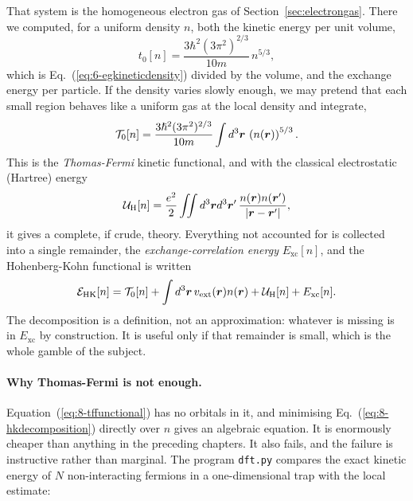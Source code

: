 That system is the homogeneous electron gas of
Section~\ref{sec:electrongas}.  There we computed, for a uniform density
$n$, both the kinetic energy per unit volume,
\begin{equation}
  t_0[n] = \frac{3\hbar^2(3\pi^2)^{2/3}}{10m}\,n^{5/3},
  \label{eq:8-tf}
\end{equation}
which is Eq.~(\ref{eq:6-egkineticdensity}) divided by the volume, and the
exchange energy per particle.  If the density varies slowly enough, we may
pretend that each small region behaves like a uniform gas at the local
density and integrate,
\begin{equation}
  \mathcal{T}_0[n] = \frac{3\hslash^2(3\pi^2)^{2/3}}{10m}
    \int d^3\bm{r}\,\left(n(\bm{r})\right)^{5/3}.
  \label{eq:8-tffunctional}
\end{equation}
This is the \emph{Thomas-Fermi} kinetic functional, and with the classical
electrostatic (Hartree) energy
\begin{equation}
  \mathcal{U}_{\mathrm{H}}[n] = \frac{e^2}{2}
    \iint d^3\bm{r}d^3\bm{r}'\,
    \frac{n(\bm{r})n(\bm{r}')}{\vert\bm{r}-\bm{r}'\vert},
  \label{eq:8-hartree}
\end{equation}
it gives a complete, if crude, theory.  Everything not accounted for is
collected into a single remainder, the \emph{exchange-correlation energy}
$E_{\mathrm{xc}}[n]$, and the Hohenberg-Kohn functional is written
\begin{equation}
  \mathcal{E}_{\mathrm{HK}}[n]
   = \mathcal{T}_0[n]
   + \int d^3\bm{r}\,v_{\mathrm{ext}}(\bm{r})n(\bm{r})
   + \mathcal{U}_{\mathrm{H}}[n]
   + E_{\mathrm{xc}}[n].
  \label{eq:8-hkdecomposition}
\end{equation}
The decomposition is a definition, not an approximation: whatever is missing
is in $E_{\mathrm{xc}}$ by construction.  It is useful only if that remainder
is small, which is the whole gamble of the subject.

\paragraph{Why Thomas-Fermi is not enough.}
Equation~(\ref{eq:8-tffunctional}) has no orbitals in it, and minimising
Eq.~(\ref{eq:8-hkdecomposition}) directly over $n$ gives an algebraic
equation.  It is enormously cheaper than anything in the preceding chapters.
It also fails, and the failure is instructive rather than marginal.  The
program \texttt{dft.py} compares the exact kinetic energy of $N$
non-interacting fermions in a one-dimensional trap with the local estimate:

